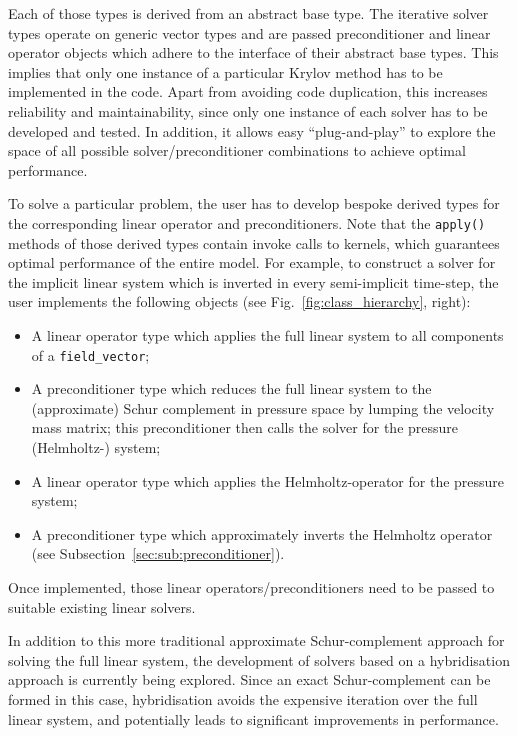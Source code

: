 \documentclass[review,times]{elsarticle}
\begin{document}
Each of those types is derived from an abstract base type. The
iterative solver types operate on generic vector types and are passed
preconditioner and linear operator objects which adhere to the
interface of their abstract base types.  This implies that only one
instance of a particular Krylov method has to be implemented in the
code. Apart from avoiding code duplication, this increases reliability
and maintainability, since only one instance of each solver has to be
developed and tested. In addition, it allows easy ``plug-and-play'' to
explore the space of all possible solver/preconditioner combinations
to achieve optimal performance.

To solve a particular problem, the user has to develop bespoke derived
types for the corresponding linear operator and preconditioners. Note
that the \texttt{apply()} methods of those derived types contain
invoke calls to kernels, which guarantees optimal performance of the entire
model. For example, to construct a solver for the implicit linear
system which is inverted in every semi-implicit time-step, the user
implements the following objects (see Fig.~\ref{fig:class_hierarchy},
right):
\begin{itemize}
\item A linear operator type which applies the full linear system to
  all components of a \texttt{field\_vector};
\item A preconditioner type which reduces the full linear system to
  the (approximate) Schur complement in pressure space by lumping the
  velocity mass matrix; this preconditioner then calls the solver for
  the pressure (Helmholtz-) system;
\item A linear operator type which applies the Helmholtz-operator for
  the pressure system;
\item A preconditioner type which approximately inverts the Helmholtz
  operator (see Subsection~\ref{sec:sub:preconditioner}).
\end{itemize}
Once implemented, those linear operators/preconditioners need to be
passed to suitable existing linear solvers.

In addition to this more traditional approximate Schur-complement
approach for solving the full linear system, the development of
solvers based on a hybridisation approach is currently being explored. Since
an exact Schur-complement can be formed in this case, hybridisation
avoids the expensive iteration over the full linear system, and
potentially leads to significant improvements in performance.
\end{document}
